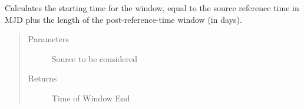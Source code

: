 \documentclass[letterpaper,10pt,english]{sphinxmanual}
\begin{document}
\begin{fulllineitems}
\begin{fulllineitems}
\label{\detokenize{index:flarestack.core.time_pdf.FixedEndBox.sig_t1}}
Calculates the starting time for the window, equal to the
source reference time in MJD plus the length of the post-reference-time
window (in days).
\begin{quote}\begin{description}
\item[{Parameters}] \leavevmode
{} \textendash{} Source to be considered

\item[{Returns}] \leavevmode
Time of Window End

\end{description}\end{quote}

\end{fulllineitems}


\end{fulllineitems}

\end{document}
